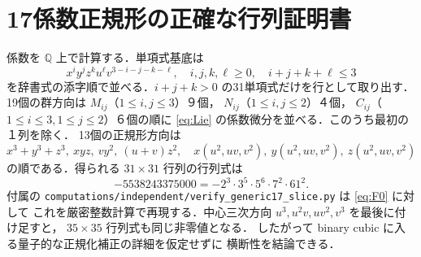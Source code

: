 \section{17係数正規形の正確な行列証明書}\label{app:rank}
係数を $\mathbb Q$ 上で計算する．単項式基底は
\[
 x^iy^jz^ku^\ell v^{3-i-j-k-\ell},\quad
 i,j,k,\ell\ge0,\quad i+j+k+\ell\le3
\]
を辞書式の添字順で並べる．$i+j+k>0$ の31単項式だけを行として取り出す．
19個の群方向は $M_{ij}$（$1\le i,j\le3$）９個，
$N_{ij}$（$1\le i,j\le2$）４個，
$C_{ij}$（$1\le i\le3,1\le j\le2$）６個の順に
\eqref{eq:Lie} の係数微分を並べる．このうち最初の１列を除く．
13個の正規形方向は
\[
 x^3+y^3+z^3,\ xyz,\ vy^2,\ (u+v)z^2,\quad
 x(u^2,uv,v^2),\ y(u^2,uv,v^2),\ z(u^2,uv,v^2)
\]
の順である．得られる $31\times31$ 行列の行列式は
\[
 -5538243375000=-2^3\cdot3^5\cdot5^6\cdot7^2\cdot61^2.
\]
付属の \nolinkurl{computations/independent/verify_generic17_slice.py} は \eqref{eq:F0} に対して
これを厳密整数計算で再現する．中心三次方向
$u^3,u^2v,uv^2,v^3$ を最後に付け足すと，
$35\times35$ 行列式も同じ非零値となる．
したがって binary cubic に入る量子的な正規化補正の詳細を仮定せずに
横断性を結論できる．
